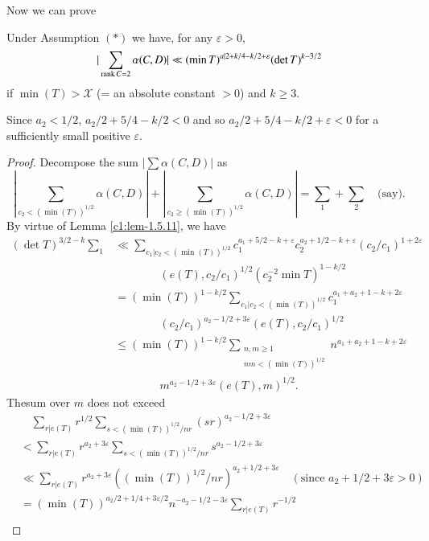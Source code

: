 Now we can prove


\setcounter{subprop}{11}
\begin{subprop}\label{c1:prop-1.5.12}
Under Assumption $(\ast)$ we have, for any $\varepsilon>0$,
$$
|\sum_{\operatorname{rank} C=2}\alpha(C,D)|\ll (\min T)^{a|2+k/4-k/2+\varepsilon}(\det
T)^{k-3/2}
$$
if $\min(T)>\mathscr{X}$ (= an absolute constant $>0$) and $k\geq 3$.
\end{subprop}

\begin{remark*}
Since $a_{2}<1/2$, $a_{2}/2+5/4-k/2<0$ and so
$a_{2}/2+5/4-k/2+\varepsilon<0$ for a sufficiently small positive
$\varepsilon$. 
\end{remark*}

\begin{proof}
Decompose the sum $|\sum \alpha(C,D)|$ as
$$
|\sum_{c_{2}<(\min(T))^{1/2}}\alpha(C,D)|+|\sum_{c_{2}\geq(\min(T))^{1/2}}\alpha(C,D)|=\sum_{1}+\sum_{2}\quad\text{(say)}.  
$$
By virtue of Lemma \ref{c1:lem-1.5.11}, we have
\begin{align*}
(\det T)^{3/2-k}\sum_{1} &\ll
  \sum_{c_{1}|c_{2}<(\min(T))^{1/2}}c_{1}^{a_{1}+5/2-k+\varepsilon}
  c_{2}^{a_{2}+1/2-k+\varepsilon}(c_{2}/c_{1})^{1+2\varepsilon}\\
&\qquad\qquad(e(T),c_{2}/c_{1})^{1/2}(c^{-2}_{2}\min
  T)^{1-k/2}\\
&= (\min (T))^{1-k/2}\sum_{c_{1}|c_{2}<(\min
    (T))^{1/2}}c^{a_{1}+a_{2}+1-k+2\varepsilon}_{1}\\
&\qquad\qquad(c_{2}/c_{1})^{a_{2}-1/2+3\varepsilon}(e(T),c_{2}/c_{1})^{1/2}\\
&\leq (\min(T))^{1-k/2}\sum_{\substack{n,m\geq 1\\ nm<(\min(T))^{1/2}}}n^{a_{1}+a_{2}+1-k+2\varepsilon}\\
&\qquad\qquad m^{a_{2}-1/2+3\varepsilon}(e(T),m)^{1/2}.
\end{align*}
The\pageoriginale sum over $m$ does not exceed
\begin{align*}
&\quad
  \sum_{r|e(T)}r^{1/2}\sum_{s<(\min(T))^{1/2}/nr}(sr)^{a_{2}-1/2+3\varepsilon}\\
&<
  \sum_{r|e(T)}r^{a_{2}+3\varepsilon} \sum_{s<(\min(T))^{1/2}/nr}s^{a_{2}-1/2+3\varepsilon}\\ 
&\ll \sum_{r|e(T)}r^{a_{2}+3\varepsilon}((\min
  (T))^{1/2}/nr)^{a_{2}+1/2+3\varepsilon} \quad(\text{since \ }
    a_{2}+1/2+3\varepsilon>0)\\
&=
    (\min(T))^{a_{2}/2+1/4+3\varepsilon/2}
    n^{-a_{2}-1/2-3\varepsilon}\sum_{r|e(T)}r^{-1/2}\\ 

\end{align*}
\end{proof}
